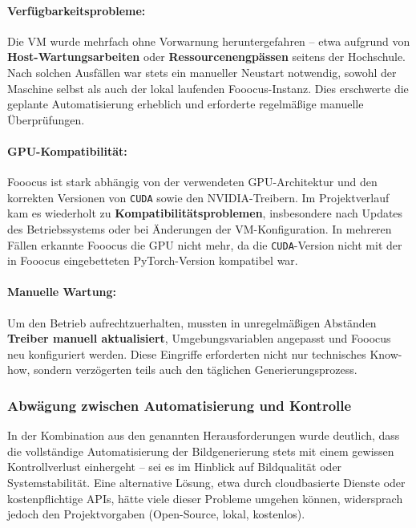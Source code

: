 \documentclass[a4paper,12pt]{article}
\begin{document}
\paragraph{Verfügbarkeitsprobleme:}
Die VM wurde mehrfach ohne Vorwarnung heruntergefahren – etwa aufgrund von \textbf{Host-Wartungsarbeiten} oder \textbf{Ressourcenengpässen} seitens der Hochschule. Nach solchen Ausfällen war stets ein manueller Neustart notwendig, sowohl der Maschine selbst als auch der lokal laufenden Fooocus-Instanz. Dies erschwerte die geplante Automatisierung erheblich und erforderte regelmäßige manuelle Überprüfungen.

\paragraph{GPU-Kompatibilität:}
Fooocus ist stark abhängig von der verwendeten GPU-Architektur und den korrekten Versionen von \texttt{CUDA} sowie den NVIDIA-Treibern. Im Projektverlauf kam es wiederholt zu \textbf{Kompatibilitätsproblemen}, insbesondere nach Updates des Betriebssystems oder bei Änderungen der VM-Konfiguration. In mehreren Fällen erkannte Fooocus die GPU nicht mehr, da die \texttt{CUDA}-Version nicht mit der in Fooocus eingebetteten PyTorch-Version kompatibel war.

\paragraph{Manuelle Wartung:}
Um den Betrieb aufrechtzuerhalten, mussten in unregelmäßigen Abständen \textbf{Treiber manuell aktualisiert}, Umgebungsvariablen angepasst und Fooocus neu konfiguriert werden. Diese Eingriffe erforderten nicht nur technisches Know-how, sondern verzögerten teils auch den täglichen Generierungsprozess.

\subsubsection*{Abwägung zwischen Automatisierung und Kontrolle}

In der Kombination aus den genannten Herausforderungen wurde deutlich, dass die vollständige Automatisierung der Bildgenerierung stets mit einem gewissen Kontrollverlust einhergeht – sei es im Hinblick auf Bildqualität oder Systemstabilität. Eine alternative Lösung, etwa durch cloudbasierte Dienste oder kostenpflichtige APIs, hätte viele dieser Probleme umgehen können, widersprach jedoch den Projektvorgaben (Open-Source, lokal, kostenlos).
\end{document}
